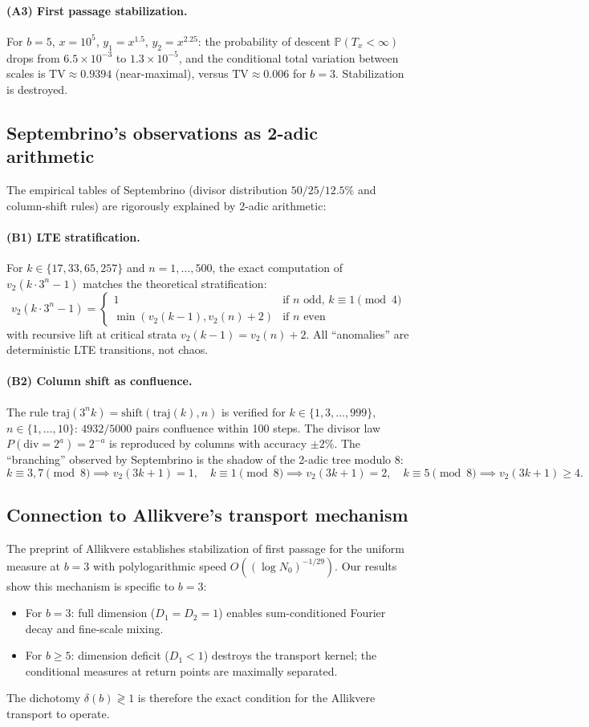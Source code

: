 \documentclass[12pt,a4paper]{article}
\theoremstyle{remark}
\begin{document}
\paragraph{(A3) First passage stabilization.} For $b=5$, $x = 10^5$, $y_1 = x^{1.5}$,
$y_2 = x^{2.25}$: the probability of descent $\mathbb{P}(T_x < \infty)$ drops from
$6.5 \times 10^{-3}$ to $1.3 \times 10^{-5}$, and the conditional total variation
between scales is $\mathrm{TV} \approx 0.9394$ (near-maximal), versus $\mathrm{TV} \approx 0.006$
for $b=3$. Stabilization is destroyed.
\subsection{Septembrino's observations as 2-adic arithmetic}
The empirical tables of Septembrino (divisor distribution $50/25/12.5\%$ and
column-shift rules) are rigorously explained by 2-adic arithmetic:
\paragraph{(B1) LTE stratification.} For $k \in \{17, 33, 65, 257\}$ and
$n = 1, \ldots, 500$, the exact computation of $v_2(k \cdot 3^n - 1)$ matches
the theoretical stratification:
\[
v_2(k \cdot 3^n - 1) =
\begin{cases}
1 & \text{if } n \text{ odd, } k \equiv 1 \pmod 4 \\
\min(v_2(k-1), v_2(n)+2) & \text{if } n \text{ even}
\end{cases}
\]
with recursive lift at critical strata $v_2(k-1) = v_2(n)+2$. All ``anomalies''
are deterministic LTE transitions, not chaos.
\paragraph{(B2) Column shift as confluence.} The rule $\mathrm{traj}(3^n k) =
\mathrm{shift}(\mathrm{traj}(k), n)$ is verified for $k \in \{1, 3, \ldots, 999\}$,
$n \in \{1, \ldots, 10\}$: $4932/5000$ pairs confluence within 100 steps. The
divisor law $P(\mathrm{div} = 2^a) = 2^{-a}$ is reproduced by columns with
accuracy $\pm 2\%$. The ``branching'' observed by Septembrino is the shadow of
the 2-adic tree modulo 8:
\[
k \equiv 3, 7 \pmod 8 \implies v_2(3k+1) = 1, \quad
k \equiv 1 \pmod 8 \implies v_2(3k+1) = 2, \quad
k \equiv 5 \pmod 8 \implies v_2(3k+1) \ge 4.
\]
\subsection{Connection to Allikvere's transport mechanism}
The preprint of Allikvere establishes stabilization of first passage for the
uniform measure at $b=3$ with polylogarithmic speed $O((\log N_0)^{-1/29})$. Our
results show this mechanism is specific to $b=3$:
\begin{itemize}
\item For $b=3$: full dimension ($D_1 = D_2 = 1$) enables sum-conditioned
Fourier decay and fine-scale mixing.
\item For $b \ge 5$: dimension deficit ($D_1 < 1$) destroys the transport
kernel; the conditional measures at return points are maximally separated.
\end{itemize}
The dichotomy $\delta(b) \gtrless 1$ is therefore the exact condition for the
Allikvere transport to operate.
\end{document}
